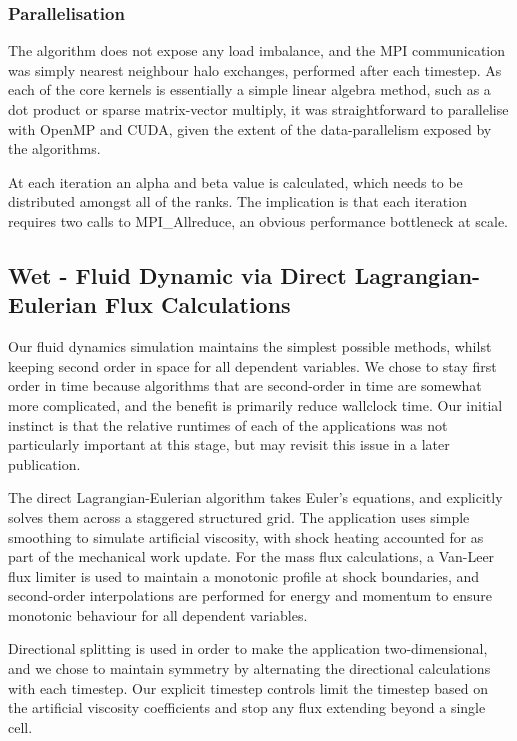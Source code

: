\documentclass[runningheads,a4paper]{llncs}
\begin{document}
\subsubsection{Parallelisation}

The algorithm does not expose any load imbalance, and the MPI communication was simply nearest neighbour halo exchanges, performed after each timestep. As each of the core kernels is essentially a simple linear algebra method, such as a dot product or sparse matrix-vector multiply, it was straightforward to parallelise with OpenMP and CUDA, given the extent of the data-parallelism exposed by the algorithms.

At each iteration an alpha and beta value is calculated, which needs to be distributed amongst all of the ranks. The implication is that each iteration requires two calls to MPI\_Allreduce, an obvious performance bottleneck at scale. 

\subsection{Wet - Fluid Dynamic via Direct Lagrangian-Eulerian Flux Calculations}

\label{sec:wet}

Our fluid dynamics simulation maintains the simplest possible methods, whilst keeping second order in space for all dependent variables. We chose to stay first order in time because algorithms that are second-order in time are somewhat more complicated, and the benefit is primarily reduce wallclock time. Our initial instinct is that the relative runtimes of each of the applications was not particularly important at this stage, but may revisit this issue in a later publication.

The direct Lagrangian-Eulerian algorithm takes Euler's equations, and explicitly solves them across a staggered structured grid. The application uses simple smoothing to simulate artificial viscosity, with shock heating accounted for as part of the mechanical work update. For the mass flux calculations, a Van-Leer flux limiter is used to maintain a monotonic profile at shock boundaries, and second-order interpolations are performed for energy and momentum to ensure monotonic behaviour for all dependent variables.

Directional splitting is used in order to make the application two-dimensional, and we chose to maintain symmetry by alternating the directional calculations with each timestep. Our explicit timestep controls limit the timestep based on the artificial viscosity coefficients and stop any flux extending beyond a single cell.
\end{document}
